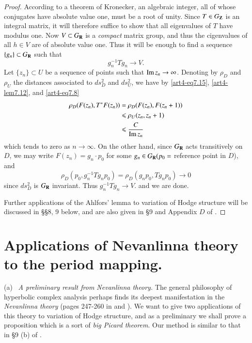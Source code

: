 \begin{proof}
According to a theorem of Kronecker, an algebraic integer, all of whose conjugates have absolute value one, must be a root of unity. Since $T \in G_{\mathbf{Z}}$ is an integral matrix, it will therefore suffice to show that all eigenvalues of $T$ have modulus one. Now $V \subset G_{\mathbf{R}}$ is a \textit{compact} matrix group, and thus the cigenvalues of all $h \in V$ are of absolute value one. Thus it will be enough to find a sequence\pageoriginale $\{g_n\} \subset G_{\mathbf{R}}$ such that 
$$
g^{-1}_n T g_n \longrightarrow V.
$$
Let $\{z_n\} \subset U$ be a sequence of points such that $\operatorname{Im} z_n \to \infty$. Denoting by $\rho_D$ and $\rho_U$  the distances associated to $ds^2_D$ and $ds^2_U$, we have by \eqref{art4-eq7.15}, \eqref{art4-lem7.12}, and \eqref{art4-eq7.8}
\begin{align*}
\rho_D (F(z_n), T^\ast F (z_n)) & = \rho_D (F(z_n), F(z_n+1))\\
& \leqslant \rho_U (z_n, z_n + 1)\\
& \leqslant \frac{C}{\operatorname{Im} z_n}
\end{align*}
which tends to zero as $n \to \infty$. On the other hand, since $G_{\mathbf{R}}$ acts transitively on $D$, we may write $F(z_n) = g_n \cdot p_0$ for some $g_n \in G_{\mathbf{R}} (p_0 =$ reference point in $D$), and
$$
\rho_D (p_0, g^{-1}_n Tg_n p_0) = \rho_D (g_n p_0, Tg_n p_0) \to 0
$$
since $ds^2_D$ is $G_{\mathbf{R}}$ invariant. Thus $g^{-1}_n Tg_n \to V$. and we are done.

Further applications of the Ahlfors' lemma to variation of Hodge structure will be discussed in \S \S 8, 9 below, and are also given in \S 9 and Appendix $D$ of \cite{art4-key19}.
\end{proof}

\section{Applications of Nevanlinna theory to the period mapping.}\label{art4-sec8}
\noindent
(a)~ \textit{A preliminary result from Nevanlinna theory.} The general philosophy of hyperbolic complex analysis perhaps finds its deepest manifestation in the \textit{Nevanlinna theory} (\cf pages 247-260 in \cite{art4-key38} and \cite{art4-key24}). We want to give two applications of this theory to variation of Hodge structure, and as a preliminary we shall prove a proposition which is a sort of \textit{big Picard theorem}. Our method is similar to that in \S 9 (b) of \cite{art4-key24}.

